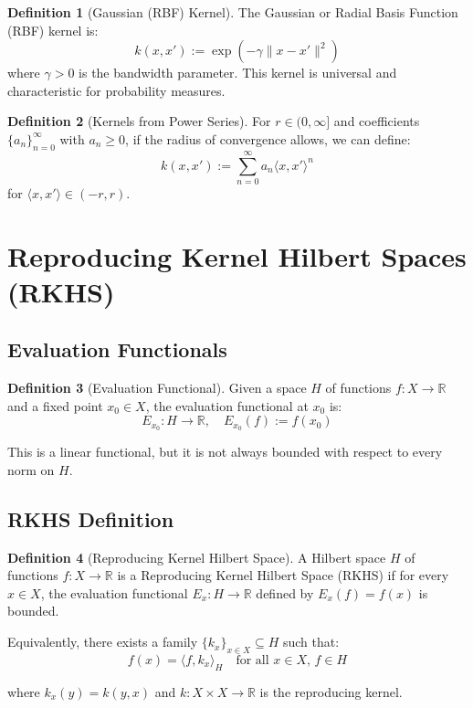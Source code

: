 \documentclass[12pt,a4paper]{article}
\theoremstyle{definition}
\newtheorem{definition}{Definition}[section]
\begin{document}
\begin{definition}[Gaussian (RBF) Kernel]
The Gaussian or Radial Basis Function (RBF) kernel is:
\[
k(x, x') := \exp\left( -\gamma \|x - x'\|^2 \right)
\]
where $\gamma > 0$ is the bandwidth parameter. This kernel is universal and characteristic for probability measures.
\end{definition}

\begin{definition}[Kernels from Power Series]
For $r \in (0, \infty]$ and coefficients $\{a_n\}_{n=0}^{\infty}$ with $a_n \geq 0$, if the radius of convergence allows, we can define:
\[
k(x, x') := \sum_{n=0}^{\infty} a_n \langle x, x' \rangle^n
\]
for $\langle x, x' \rangle \in (-r, r)$.
\end{definition}

\section{Reproducing Kernel Hilbert Spaces (RKHS)}

\subsection{Evaluation Functionals}

\begin{definition}[Evaluation Functional]
Given a space $H$ of functions $f: X \to \mathbb{R}$ and a fixed point $x_0 \in X$, the evaluation functional at $x_0$ is:
\[
E_{x_0} : H \to \mathbb{R}, \quad E_{x_0}(f) := f(x_0)
\]

This is a linear functional, but it is not always bounded with respect to every norm on $H$.
\end{definition}

\subsection{RKHS Definition}

\begin{definition}[Reproducing Kernel Hilbert Space]
A Hilbert space $H$ of functions $f: X \to \mathbb{R}$ is a Reproducing Kernel Hilbert Space (RKHS) if for every $x \in X$, the evaluation functional $E_x : H \to \mathbb{R}$ defined by $E_x(f) = f(x)$ is bounded.

Equivalently, there exists a family $\{k_x\}_{x \in X} \subseteq H$ such that:
\[
f(x) = \langle f, k_x \rangle_H \quad \text{for all } x \in X, \, f \in H
\]

where $k_x(y) = k(y, x)$ and $k: X \times X \to \mathbb{R}$ is the reproducing kernel.
\end{definition}
\end{document}
